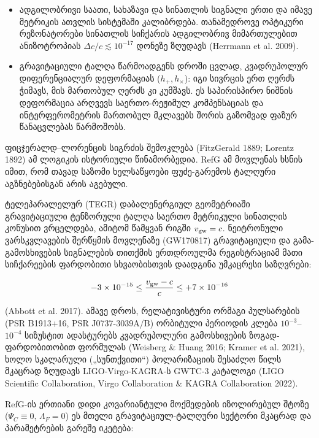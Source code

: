 \documentclass[11pt,a4paper]{article}
\begin{document}
\begin{itemize}
\item ადგილობრივი საათი, სახაზავი და სინათლის სიგნალი ერთი და იმავე მეტრიკის ათვლის სისტემაში კალიბრდება. თანამედროვე ოპტიკური რეზონატორები სინათლის სიჩქარის ადგილობრივ მიმართულებით ანიზოტროპიას $\Delta c/c\lesssim10^{-17}$ დონეზე ზღუდავს (Herrmann et al. 2009).
\item გრავიტაციული ტალღა წარმოადგენს დროში ცვლად, კვადრუპოლურ დიფერენციალურ დეფორმაციას ($h_+,h_\times$): იგი სივრცის ერთ ღერძს ჭიმავს, მის მართობულ ღერძს კი კუმშავს. ეს საპირისპირო ნიშნის დეფორმაცია არღვევს საერთო-რეჟიმულ კომპენსაციას და ინტერფერომეტრის მართობულ მკლავებს შორის გაზომვად ფაზურ წანაცვლებას წარმოშობს.

\end{itemize}
ფიცჯერალდ–ლორენცის სიგრძის შემოკლება (FitzGerald 1889; Lorentz 1892) ამ ლოგიკის ისტორიული წინამორბედია. RefG ამ მოვლენას ხსნის იმით, რომ თავად საზომი ხელსაწყოები ფუძე-გარემოს ტალღური აგზნებებისგან არის აგებული.

ტელეპარალელურ (TEGR) დაბალენერგიულ გეომეტრიაში გრავიტაციული ტენზორული ტალღა საერთო მეტრიკული სინათლის კონუსით ვრცელდება, ამიტომ წამყვან რიგში $v_{\rm gw}=c$. ნეიტრონული ვარსკვლავების შერწყმის მოვლენაზე (GW170817) გრავიტაციული და გამა-გამოსხივების სიგნალების თითქმის ერთდროულმა რეგისტრაციამ მათი სიჩქარეების ფარდობითი სხვაობისთვის დაადგინა უმკაცრესი საზღვრები:

\[
-3 \times 10^{-15} \le \frac{v_{\rm gw} - c}{c} \le +7 \times 10^{-16}
\]

(Abbott et al. 2017). ამავე დროს, რელატივისტური ორმაგი პულსარების (PSR B1913+16, PSR J0737-3039A/B) ორბიტული პერიოდის კლება $10^{-3}$–$10^{-4}$ სიზუსტით ადასტურებს კვადრუპოლური გამოსხივების ზოგად-ფარდობითობით ფორმულას (Weisberg \& Huang 2016; Kramer et al. 2021), ხოლო სკალარული („სუნთქვითი“) პოლარიზაციის შესაძლო წილს მკაცრად ზღუდავს LIGO-Virgo-KAGRA-ს GWTC-3 კატალოგი (LIGO Scientific Collaboration, Virgo Collaboration \& KAGRA Collaboration 2022).

RefG-ის ერთიანი დიდი კოვარიანტული მოქმედების იზოლირებულ შტოზე ($\Psi_C \equiv 0$, $\Lambda_F = 0$) ეს მთელი გრავიტაციულ-ტალღური სექტორი მკაცრად და პარამეტრების გარეშე იკეტება:
\end{document}
